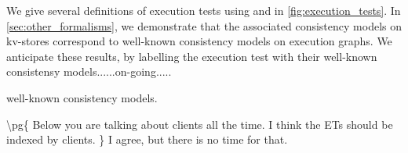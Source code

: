 %

We give several definitions of
execution tests using \vshiftname and \cancommitname in \cref{fig:execution_tests}. 
In \cref{sec:other_formalisms}, we demonstrate that the associated consistency
models on kv-stores correspond to well-known consistency models on 
execution graphs. We anticipate these results, by labelling the
execution test with their well-known consistensy models......on-going.....

well-known consistency models.

\ac{
\pg{

Below you are talking about clients all the time. I think the ETs
should be indexed by clients.

}
I agree, but there is no time for that.
}






